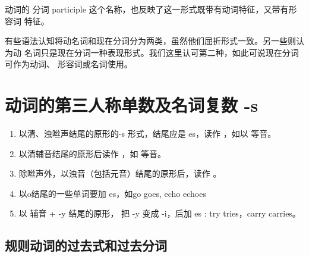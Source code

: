 动词的 分词 participle 这个名称，也反映了这一形式既带有动词特征，又带有形容词
特征。

有些语法认知将动名词和现在分词分为两类，虽然他们屈折形式一致。另一些则认为动
名词只是现在分词一种表现形式。我们这里认可第二种，如此可说现在分词可作为动词、
形容词或名词使用。


\section{动词的第三人称单数及名词复数 -s }

\begin{enumerate}
\item 以清、浊咝声结尾的原形的-s 形式，结尾应是 es，读作  ，如以
   等音。
\item 以清辅音结尾的原形后读作 ，如  等音。
\item 除咝声外，以浊音（包括元音）结尾的原形后，读作 。
\item 以o结尾的一些单词要加 es，如go  \Rightarrow goes, echo  \Rightarrow echoes
\item 以 辅音 + -y 结尾的原形， 把 -y 变成 -i，后加 es : try \Rightarrow tries，carry  \Rightarrow carries。
\end{enumerate}

\subsection{规则动词的过去式和过去分词}

